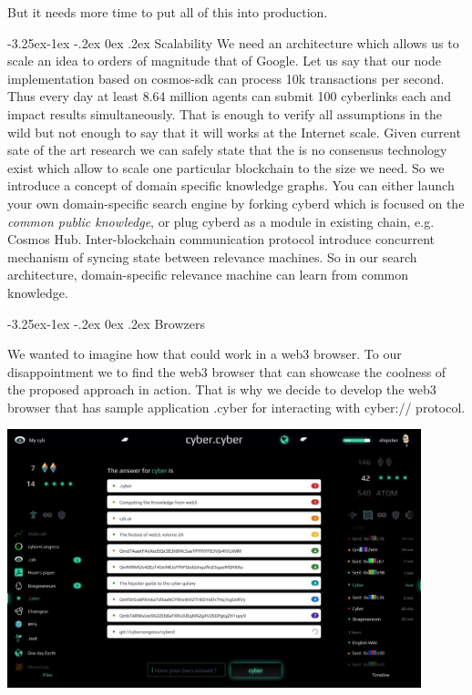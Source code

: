\documentclass[8pt,oneside]{amsart}
\makeatletter
\newcommand{\linkred}[2]{\href{#1}{\color{red}{#2}}}
\renewcommand\subsection{\@startsection{subsection}{2}{\z@}%
                                     {-3.25ex\@plus -1ex \@minus -.2ex}%
                                     {0ex \@plus .2ex}%
                                     {\play\Large}}%
\newcommand{\titleSection}[1]{\subsection{#1}}
\newcommand{\code}[1]{{\PlayBold #1}}
\newenvironment{Figure}
  {\par\medskip\noindent\minipage{\linewidth}}
  {\endminipage\par\medskip}
\makeatother
\begin{document}
But it needs more time to put all of this into production.

\titleSection{Scalability}\label{scalability}
We need an architecture which allows us to scale an idea to orders of magnitude that of Google. Let us say that our node implementation based on \code{cosmos-sdk} can process 10k transactions per second. Thus every day at least 8.64 million agents can submit 100 cyberlinks each and impact results simultaneously. That is enough to verify all assumptions in the wild but not enough to say that it will works at the Internet scale. Given current sate of the art research we can safely state that the is no consensus technology exist which allow to scale one particular blockchain to the size we need. So we introduce a concept of domain specific knowledge graphs. You can either launch your own domain-specific search engine by forking cyberd which is focused on the \textit{common public knowledge}, or plug cyberd as a module in existing chain, e.g. Cosmos Hub. Inter-blockchain communication protocol introduce concurrent mechanism of syncing state between relevance machines. So in our search architecture, domain-specific relevance machine can learn from common knowledge.

\titleSection{Browzers}\label{In-browser implementation}

We wanted to imagine how that could work in a web3 browser. To our disappointment we \linkred{https://github.com/cybercongress/cyb/blob/master/docs/comparison.md}{were not able} to find the web3 browser that can showcase the coolness of the proposed approach in action. That is why we decide to develop the web3 browser \linkred{https://github.com/cybercongress/cyb/blob/master/docs/cyb.md}{cyb} that has sample application .cyber for interacting with \code{cyber://} protocol.

\begin{Figure}
  \medskip
  \centering
  \includegraphics[width=0.9\textwidth]{cyb.jpg}
  \medskip
\end{Figure}
\end{document}
